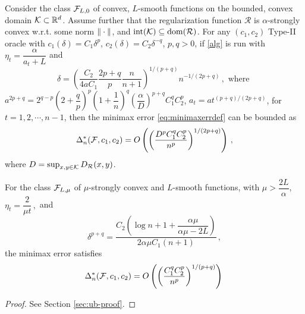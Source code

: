 \begin{theorem}
\label{thm:ub}
Consider the class $\mathcal{F}_{L,0}$ of convex, $L$-smooth functions on the bounded, convex domain $\mathcal{K} \subset \mathbb{R}^d$.
Assume further that the regularization function $\mathcal{R}$ is $\alpha$-strongly convex w.r.t. some norm $\|\cdot\|$, and $\operatorname{int}(\mathcal{K})\subseteq \operatorname{dom}(\mathcal{R})$.
For any $(c_1,c_2)$ Type-II oracle 
 with $c_1(\delta) = C_1 \delta^p$, $c_2(\delta) = C_2 \delta^{-q}$, $p,q>0$, 
 if \cref{alg} is run with $\eta_t = \dfrac{\alpha}{a_t+L}$ and
  \[
 \delta = \left( \dfrac{C_2}{4aC_1}\dfrac{2p+q}{p}\dfrac{n}{n+1}\right)^{1/(p+q)}n^{-1/(2p+q)} \,, \text{ where }
 \] 
 $a^{2p+q} =2^{q-p}\left( 2+\dfrac{q}{p} \right)^p\left(1+ \dfrac{1}{n} \right)^q \left( \dfrac{\alpha}{D} \right)^{p+q}C_1^q C_2^p $,
 $a_t = a t^{(p+q)/(2p+q)}$, for $t=1, 2, \cdots, n-1$,
then  the minimax error \eqref{eq:minimaxerrdef} can be bounded as
 \begin{align*}
 \Delta_n^*(\mathcal{F},c_1,c_2)= O\left(\left(\dfrac{D^pC_1^qC_2^p}{n^p}\right)^{1/(2p+q)}\right)\,,
 \end{align*}
 where $D=\sup_{x,y\in \mathcal{K}} D_{\mathcal{R}}(x,y)$.
 
For the class $\mathcal{F}_{L,\mu}$ of $\mu$-strongly convex and $L$-smooth functions, with $\mu > \dfrac{2L}{\alpha}$, 
$
 \eta_t = \dfrac{2}{\mu t} \,,
$ and
\[
\delta^{p+q} =  \dfrac{C_2\left( \log n+1+\dfrac{\alpha \mu}{\alpha \mu -2L}\right)}{2\alpha \mu C_1 (n+1)} \,,
\]
the minimax error satisfies 
 \begin{align*}
\Delta_n^*(\mathcal{F},c_1,c_2)= O\left( \left(\dfrac{C_1^q C_2^p}{n^p} \right)^{1/(p+q)} \right)\,
 \end{align*}
\end{theorem}
\begin{proof}
See Section \ref{sec:ub-proof}.
\end{proof}

